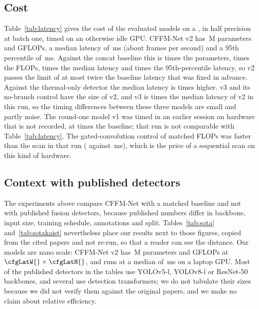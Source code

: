 \subsection{Cost}
\label{sec:cost}
Table~\ref{tab:latency} gives the cost of the evaluated models on a \latLocalDevice{}, in half precision at batch one, timed on an otherwise idle GPU. CFFM-Net v2 has \latLocalVtwoParamsM{}\,M parameters and \latLocalVtwoGflops{} GFLOPs, a median latency of \latLocalVtwoMedianMs{}\,ms (about \latLocalVtwoFps{} frames per second) and a 95th percentile of \latLocalVtwoPNinetyFiveMs{}\,ms. Against the concat baseline this is \latLocalRatioParams{} times the parameters, \latLocalRatioGflops{} times the FLOPs, \latLocalRatioMedian{} times the median latency and \latLocalRatioPNinetyFive{} times the 95th-percentile latency, so v2 passes the limit of at most twice the baseline latency that was fixed in advance. Against the thermal-only detector the median latency is \latLocalVtwoOverThmMedian{} times higher. v3 and its no-branch control have the size of v2, and v3 is \latLocalVthreeOverVtwoMedian{} times the median latency of v2 in this run, so the timing differences between these three models are small and partly noise. The round-one model v1 was timed in an earlier session on hardware that is not recorded, at \latLlvipRatioMedian{} times the baseline; that run is not comparable with Table~\ref{tab:latency}. The gated-convolution control of matched FLOPs was faster than the scan in that run (\latLlvipCffmVoneGconvMedianMs{} against \latLlvipCffmVoneMedianMs{}\,ms), which is the price of a sequential scan on this kind of hardware.



\subsection{Context with published detectors}
\label{sec:sota}
The experiments above compare CFFM-Net with a matched baseline and not with published fusion detectors, because published numbers differ in backbone, input size, training schedule, annotations and split. Tables~\ref{tab:sota} and~\ref{tab:sotakaist} nevertheless place our results next to those figures, copied from the cited papers and not re-run, so that a reader can see the distance. Our models are nano scale: CFFM-Net v2 has \latLocalVtwoParamsM{}\,M parameters and \latLocalVtwoGflops{} GFLOPs at $\cfgLatW{}\times\cfgLatH{}$, and runs at a median of \latLocalVtwoMedianMs{}\,ms on a laptop GPU. Most of the published detectors in the tables use YOLOv5-l, YOLOv8-l or ResNet-50 backbones, and several use detection transformers; we do not tabulate their sizes because we did not verify them against the original papers, and we make no claim about relative efficiency.


